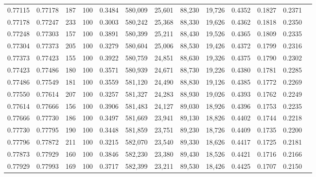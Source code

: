 \begin{tabular}{rrrrrrrrrrrrr}
0.77115 & 0.77178 &   187 & 100 &                                     0.3484 & 580,009 &  25,601 &  88,230 &  19,726 & 0.4352 & 0.1827 & 0.2371 \\
0.77178 & 0.77247 &   233 & 100 &                                     0.3003 & 580,242 &  25,368 &  88,330 &  19,626 & 0.4362 & 0.1818 & 0.2350 \\
0.77248 & 0.77303 &   157 & 100 &                                     0.3891 & 580,399 &  25,211 &  88,430 &  19,526 & 0.4365 & 0.1809 & 0.2335 \\
0.77304 & 0.77373 &   205 & 100 &                                     0.3279 & 580,604 &  25,006 &  88,530 &  19,426 & 0.4372 & 0.1799 & 0.2316 \\
0.77373 & 0.77423 &   155 & 100 &                                     0.3922 & 580,759 &  24,851 &  88,630 &  19,326 & 0.4375 & 0.1790 & 0.2302 \\
0.77423 & 0.77486 &   180 & 100 &                                     0.3571 & 580,939 &  24,671 &  88,730 &  19,226 & 0.4380 & 0.1781 & 0.2285 \\
0.77486 & 0.77549 &   181 & 100 &                                     0.3559 & 581,120 &  24,490 &  88,830 &  19,126 & 0.4385 & 0.1772 & 0.2269 \\
0.77550 & 0.77614 &   207 & 100 &                                     0.3257 & 581,327 &  24,283 &  88,930 &  19,026 & 0.4393 & 0.1762 & 0.2249 \\
0.77614 & 0.77666 &   156 & 100 &                                     0.3906 & 581,483 &  24,127 &  89,030 &  18,926 & 0.4396 & 0.1753 & 0.2235 \\
0.77666 & 0.77730 &   186 & 100 &                                     0.3497 & 581,669 &  23,941 &  89,130 &  18,826 & 0.4402 & 0.1744 & 0.2218 \\
0.77730 & 0.77795 &   190 & 100 &                                     0.3448 & 581,859 &  23,751 &  89,230 &  18,726 & 0.4409 & 0.1735 & 0.2200 \\
0.77796 & 0.77872 &   211 & 100 &                                     0.3215 & 582,070 &  23,540 &  89,330 &  18,626 & 0.4417 & 0.1725 & 0.2181 \\
0.77873 & 0.77929 &   160 & 100 &                                     0.3846 & 582,230 &  23,380 &  89,430 &  18,526 & 0.4421 & 0.1716 & 0.2166 \\
0.77929 & 0.77993 &   169 & 100 &                                     0.3717 & 582,399 &  23,211 &  89,530 &  18,426 & 0.4425 & 0.1707 & 0.2150 \\

\end{tabular}
